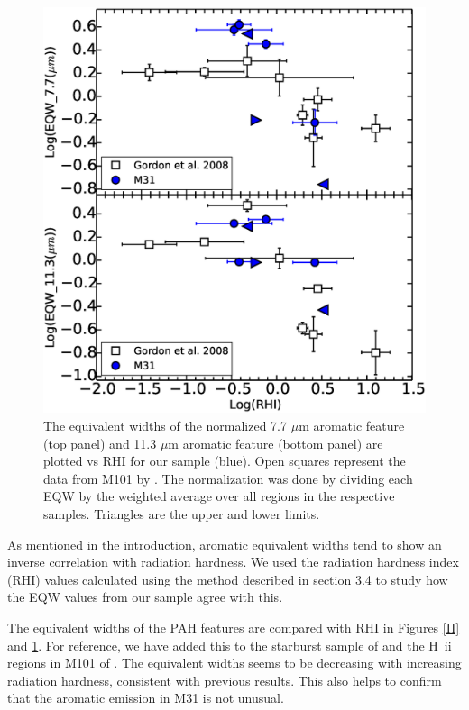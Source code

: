 \begin{figure}
\includegraphics[scale=0.30]{./Gordvsmy.eps}
\caption{ The equivalent widths of the normalized 7.7 $\mu$m aromatic feature (top panel) and 11.3 $\mu$m aromatic feature (bottom panel) are plotted vs RHI for our sample (blue). Open squares represent the data from M101 by \citet{Gordon:2008lr}. The normalization was done by dividing each EQW by the weighted average over all regions in the respective samples. Triangles are the upper and lower limits.}
\label{gordII}

\end{figure}

As mentioned in the introduction, aromatic equivalent widths tend to show an inverse correlation with radiation hardness. We used the radiation hardness index (RHI) values calculated using the method described in section 3.4 to study how the EQW values from our sample agree with this.

The equivalent widths of the PAH features are compared with RHI in Figures \ref{II} and \ref{gordII}.
For reference, we have added this to the starburst sample of \citet{Engelbracht_2008} and the H~{\sc ii} regions in M101 of \citet{Gordon:2008lr}. The equivalent widths seems to be decreasing with increasing radiation hardness, consistent with previous results. This also helps to confirm that the aromatic emission in M31 is not unusual. 

